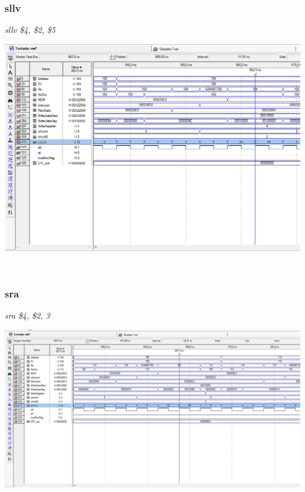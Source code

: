 \documentclass{article}
\begin{document}
    \subsubsection{sllv}
    {\it sllv \$4, \$2, \$5}\\
    \begin{center}
        \includegraphics[scale=0.25]{sllv.PNG}
    \end{center}
    
    \\    
    \subsubsection{sra}
    {\it sra \$4, \$2, 3}\\
    \begin{center}
        \includegraphics[scale=0.25]{sra.PNG}
    \end{center}
    
    \\    
\end{document}
